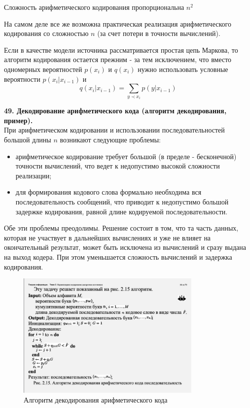 \documentclass[14pt]{article}
\begin{document}
Сложность арифметического кодирования пропорциональна \(n^2\)

На самом деле все же возможна практическая реализация арифметического кодирования со сложностью \(n\) (за счет потери в точности вычислений).

Если в качестве модели источника рассматривается простая цепь
Маркова, то алгоритм кодирования остается прежним - за тем
исключением, что вместо одномерных вероятностей \(p(x_i)\) и \(q(x_i)\) нужно
использовать условные вероятности  \(p(x_i|x_{i-1})\) и
\begin{displaymath}
    q(x_i|x_{i-1}) = \sum_{y \prec x_i} p(y|x_{i-1})
\end{displaymath}

\bigskip
\textbf{49. Декодирование арифметического кода (алгоритм декодирования, пример).} \\

При арифметическом кодировании и использовании последовательностей большой длины \(n\) возникают следующие проблемы:
\begin{itemize}
    \item арифметическое кодирование требует большой (в пределе - бесконечной) точности вычислений, что ведет к недопустимо высокой сложности реализации;
    \item для формирования кодового слова формально необходима вся последовательность сообщений, что приводит к недопустимо большой задержке кодирования, равной длине кодируемой последовательности.
\end{itemize}

Обе эти проблемы преодолимы. Решение состоит в том, что та часть данных, которая не участвует в дальнейших вычислениях и уже не влияет на окончательный результат, может быть исключена из вычислений и сразу выдана на выход кодера. При этом уменьшается сложность вычислений и задержка кодирования.

\begin{figure}[ht!]
\centering
    \includegraphics[width=90mm]{aryph_decode_alg.png}
\caption{Алгоритм декодирования арифметического кода}
\end{figure}
\end{document}
